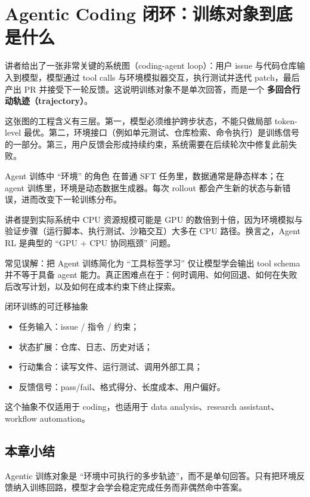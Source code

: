 \section{Agentic Coding 闭环：训练对象到底是什么}

讲者给出了一张非常关键的系统图（coding-agent loop）：用户 issue 与代码仓库输入到模型，模型通过 tool calls 与环境模拟器交互，执行测试并迭代 patch，最后产出 PR 并接受下一轮反馈。这说明训练对象不是单次回答，而是一个 \textbf{多回合行动轨迹（trajectory）}。

这张图的工程含义有三层。第一，模型必须维护跨步状态，不能只做局部 token-level 最优。第二，环境接口（例如单元测试、仓库检索、命令执行）是训练信号的一部分。第三，用户反馈会形成持续约束，系统需要在后续轮次中修复此前失败。

\begin{knowledgebox}{Agent 训练中 ``环境'' 的角色}
在普通 SFT 任务里，数据通常是静态样本；在 agent 训练里，环境是动态数据生成器。每次 rollout 都会产生新的状态与新错误，进而改变下一轮训练分布。
\end{knowledgebox}

讲者提到实际系统中 CPU 资源规模可能是 GPU 的数倍到十倍，因为环境模拟与验证步骤（运行脚本、执行测试、沙箱交互）大多在 CPU 路径。换言之，Agent RL 是典型的 ``GPU + CPU 协同瓶颈'' 问题。

\begin{warningbox}{常见误解：把 Agent 训练简化为 ``工具标签学习''}
仅让模型学会输出 tool schema 并不等于具备 agent 能力。真正困难点在于：何时调用、如何回退、如何在失败后改写计划，以及如何在成本约束下终止探索。
\end{warningbox}

\begin{importantbox}{闭环训练的可迁移抽象}
\begin{itemize}
    \item 任务输入：issue / 指令 / 约束；
    \item 状态扩展：仓库、日志、历史对话；
    \item 行动集合：读写文件、运行测试、调用外部工具；
    \item 反馈信号：pass/fail、格式得分、长度成本、用户偏好。
\end{itemize}
这个抽象不仅适用于 coding，也适用于 data analysis、research assistant、workflow automation。
\end{importantbox}

\subsection{本章小结}
Agentic 训练对象是 ``环境中可执行的多步轨迹''，而不是单句回答。只有把环境反馈纳入训练回路，模型才会学会稳定完成任务而非偶然命中答案。

